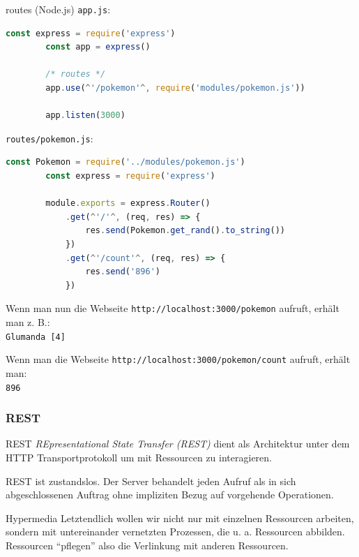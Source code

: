 \begin{example}{routes (Node.js)}
    \texttt{app.js}:
    \begin{lstlisting}[language=JavaScript]
        const express = require('express')
        const app = express()

        /* routes */
        app.use(^'/pokemon'^, require('modules/pokemon.js'))

        app.listen(3000)
    \end{lstlisting}

    \texttt{routes/pokemon.js}:
    \begin{lstlisting}[language=JavaScript]
        const Pokemon = require('../modules/pokemon.js')
        const express = require('express')
        
        module.exports = express.Router()
            .get(^'/'^, (req, res) => {
                res.send(Pokemon.get_rand().to_string())
            })
            .get(^'/count'^, (req, res) => {
                res.send('896')
            })
    \end{lstlisting}

    Wenn man nun die Webseite \texttt{http://localhost:3000/pokemon} aufruft, erhält man z. B.:\\
    \texttt{Glumanda [4]}

    Wenn man die Webseite \texttt{http://localhost:3000/pokemon/count} aufruft, erhält man:\\
    \texttt{896}
\end{example}

\subsubsection{REST}

\begin{defi}{REST}
    \emph{REpresentational State Transfer (REST)} dient als Architektur unter dem HTTP Transportprotokoll um mit Ressourcen zu interagieren.

    REST ist zustandslos.
    Der Server behandelt jeden Aufruf als in sich abgeschlossenen Auftrag ohne impliziten Bezug auf vorgehende Operationen.
\end{defi}

\begin{defi}{Hypermedia}
    Letztendlich wollen wir nicht nur mit einzelnen Ressourcen arbeiten, sondern mit untereinander vernetzten Prozessen, die u. a. Ressourcen abbilden.
    Ressourcen \enquote{pflegen} also die Verlinkung mit anderen Ressourcen.
\end{defi}

